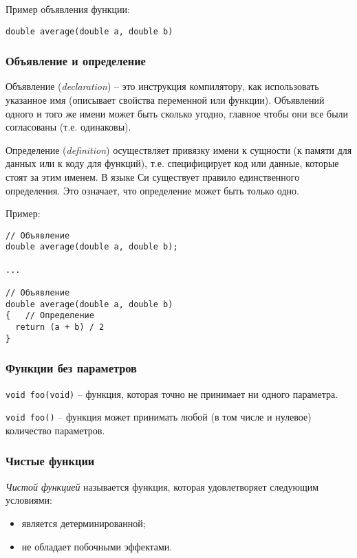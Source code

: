 Пример объявления функции:
\begin{verbatim}
double average(double a, double b)
\end{verbatim}

\subsubsection{Объявление и определение}

Объявление (\textit{declaration}) – это инструкция компилятору, как использовать указанное имя (описывает свойства переменной или функции). Объявлений одного и того же имени может быть сколько угодно, главное чтобы они все были согласованы (т.е. одинаковы).

Определение (\textit{definition}) осуществляет привязку имени к сущности (к памяти для данных или к коду для функций), т.е. специфицирует код или данные, которые стоят за этим именем. В языке Си существует правило единственного определения. Это означает, что определение может быть только одно.

Пример:

\begin{verbatim}
// Объявление
double average(double a, double b);

...

// Объявление
double average(double a, double b)
{   // Определение
  return (a + b) / 2
}
\end{verbatim}

\subsubsection{Функции без параметров}

\texttt{void foo(void)} -- функция, которая точно не принимает ни одного параметра.

\texttt{void foo()} -- функция может принимать любой (в том числе и нулевое) количество параметров.

\subsubsection{Чистые функции}

\begin{definition}
  \textit{Чистой функцией} называется функция, которая удовлетворяет следующим условиями:
  \begin{itemize}
    \item является детерминированной;
    \item не обладает побочными эффектами.
  \end{itemize}
\end{definition}

